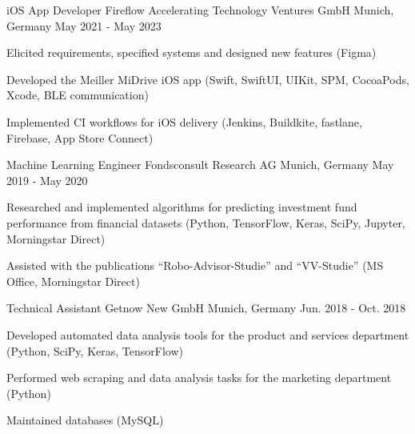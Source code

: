 \begin{cventries}

\cventry
{iOS App Developer} %
{Fireflow Accelerating Technology Ventures GmbH} %
{Munich, Germany} %
{May 2021 - May 2023} %
{ %
\begin{cvitems}
\item {Elicited requirements, specified systems and designed new features (Figma)}
\item {Developed the Meiller MiDrive iOS app (Swift, SwiftUI, UIKit, SPM, CocoaPods, Xcode, BLE communication)}
\item {Implemented CI workflows for iOS delivery (Jenkins, Buildkite, fastlane, Firebase, App Store Connect)}
\end{cvitems}
}


\cventry
{Machine Learning Engineer} %
{Fondsconsult Research AG} %
{Munich, Germany} %
{May 2019 - May 2020} %
{ %
\begin{cvitems}
\item {Researched and implemented algorithms for predicting investment fund performance from financial datasets (Python, TensorFlow, Keras, SciPy, Jupyter, Morningstar Direct)}
\item {Assisted with the publications ``Robo-Advisor-Studie'' and ``VV-Studie'' (MS Office, Morningstar Direct)}
\end{cvitems}
}


\cventry
{Technical Assistant} %
{Getnow New GmbH} %
{Munich, Germany} %
{Jun. 2018 - Oct. 2018} %
{ %
\begin{cvitems}
\item {Developed automated data analysis tools for the product and services department (Python, SciPy, Keras, TensorFlow)}
\item {Performed web scraping and data analysis tasks for the marketing department (Python)}
\item {Maintained databases (MySQL)}
\end{cvitems}
}

\end{cventries}
